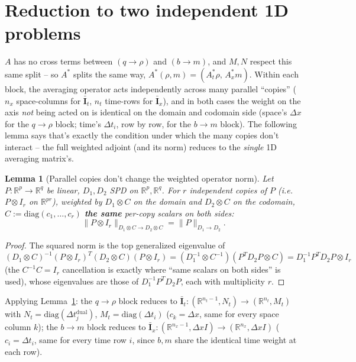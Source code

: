 \documentclass[11pt]{article}
\newtheorem{lemma}{Lemma}
\newcommand{\dt}{\Delta t}
\newcommand{\dx}{\Delta x}
\begin{document}
\section{Reduction to two independent 1D problems}
\label{sec:reduction}

$A$ has no cross terms between $(q\to\rho)$ and $(b\to m)$, and $M,N$ respect this same
split -- so $A^*$ splits the same way, $A^*(\rho,m)=(A_t^*\rho,\,A_x^*m)$. Within each
block, the averaging operator acts independently across many parallel ``copies'' ($n_x$
space-columns for $\bar{\mathbf I}_t$, $n_t$ time-rows for $\bar{\mathbf I}_x$), and in
both cases the weight on the axis \emph{not} being acted on is identical on the domain
and codomain side (space's $\dx$ for the $q\to\rho$ block; time's $\dt_i$, row by row, for
the $b\to m$ block). The following lemma says that's exactly the condition under which the
many copies don't interact -- the full weighted adjoint (and its norm) reduces to the
\emph{single} 1D averaging matrix's.

\begin{lemma}[Parallel copies don't change the weighted operator norm]
\label{lem:copies}
Let $P:\mathbb R^p\to\mathbb R^q$ be linear, $D_1,D_2$ SPD on $\mathbb R^p,\mathbb R^q$.
For $r$ independent copies of $P$ (i.e.\ $P\otimes I_r$ on $\mathbb R^{pr}$), weighted by
$D_1\otimes C$ on the domain and $D_2\otimes C$ on the codomain, $C:=\mathrm{diag}(c_1,
\ldots,c_r)$ \textbf{the same} per-copy scalars on both sides:
\[
  \|P\otimes I_r\|_{D_1\otimes C\to D_2\otimes C} = \|P\|_{D_1\to D_2}.
\]
\end{lemma}
\begin{proof}
The squared norm is the top generalized eigenvalue of $(D_1\otimes C)^{-1}(P\otimes
I_r)^T(D_2\otimes C)(P\otimes I_r) = (D_1^{-1}\otimes C^{-1})(P^TD_2P\otimes C) =
D_1^{-1}P^TD_2P\otimes I_r$ (the $C^{-1}C=I_r$ cancellation is exactly where ``same
scalars on both sides'' is used), whose eigenvalues are those of $D_1^{-1}P^TD_2P$, each
with multiplicity $r$.
\end{proof}

Applying Lemma~\ref{lem:copies}: the $q\to\rho$ block reduces to $\bar{\mathbf I}_t:
(\mathbb R^{n_t-1},N_t)\to(\mathbb R^{n_t},M_t)$ with $N_t=\mathrm{diag}(\dt_j^{
\mathrm{dual}})$, $M_t=\mathrm{diag}(\dt_i)$ ($c_k=\dx$, same for every space column
$k$); the $b\to m$ block reduces to $\bar{\mathbf I}_x:(\mathbb R^{n_x-1},\dx
I)\to(\mathbb R^{n_x},\dx I)$ ($c_i=\dt_i$, same for every time row $i$, since $b,m$
share the identical time weight at each row).
\end{document}
